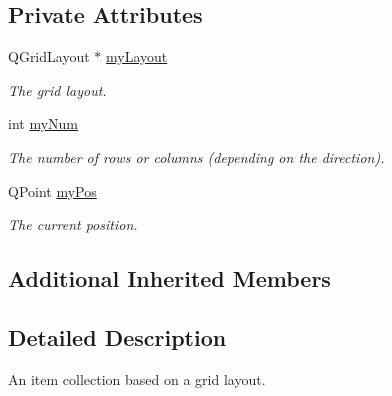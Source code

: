 \subsection*{Private Attributes}
\begin{DoxyCompactItemize}
\item 
\hypertarget{class_u_i_1_1_item_grid_widget_ade30c3c93befa9887b2aa8f4e5cfbed8}{Q\-Grid\-Layout $\ast$ \hyperlink{class_u_i_1_1_item_grid_widget_ade30c3c93befa9887b2aa8f4e5cfbed8}{my\-Layout}}\label{class_u_i_1_1_item_grid_widget_ade30c3c93befa9887b2aa8f4e5cfbed8}

\begin{DoxyCompactList}\small\item\em The grid layout. \end{DoxyCompactList}\item 
\hypertarget{class_u_i_1_1_item_grid_widget_acf430f441518aa7c15177783810909d0}{int \hyperlink{class_u_i_1_1_item_grid_widget_acf430f441518aa7c15177783810909d0}{my\-Num}}\label{class_u_i_1_1_item_grid_widget_acf430f441518aa7c15177783810909d0}

\begin{DoxyCompactList}\small\item\em The number of rows or columns (depending on the direction). \end{DoxyCompactList}\item 
\hypertarget{class_u_i_1_1_item_grid_widget_ad6013bc0956dbb549ae69fa21025109f}{Q\-Point \hyperlink{class_u_i_1_1_item_grid_widget_ad6013bc0956dbb549ae69fa21025109f}{my\-Pos}}\label{class_u_i_1_1_item_grid_widget_ad6013bc0956dbb549ae69fa21025109f}

\begin{DoxyCompactList}\small\item\em The current position. \end{DoxyCompactList}\end{DoxyCompactItemize}
\subsection*{Additional Inherited Members}


\subsection{Detailed Description}
An item collection based on a grid layout. 

